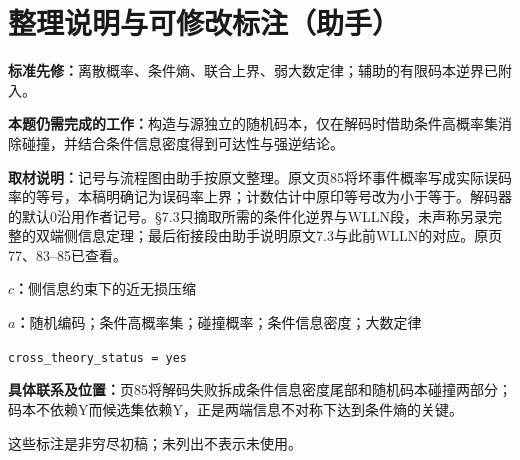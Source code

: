 \documentclass[UTF8,11pt,a4paper]{ctexart}
\theoremstyle{definition}\newtheorem*{definition}{Definition}
\theoremstyle{remark}\newtheorem*{remark}{Remark}
\begin{document}
\section*{整理说明与可修改标注（助手）}
\textbf{标准先修：}离散概率、条件熵、联合上界、弱大数定律；辅助的有限码本逆界已附入。

\textbf{本题仍需完成的工作：}构造与源独立的随机码本，仅在解码时借助条件高概率集消除碰撞，并结合条件信息密度得到可达性与强逆结论。

\textbf{取材说明：}记号与流程图由助手按原文整理。原文页85将坏事件概率写成实际误码率的等号，本稿明确记为误码率上界；计数估计中原印等号改为小于等于。解码器的默认0沿用作者记号。§7.3只摘取所需的条件化逆界与WLLN段，未声称另录完整的双端侧信息定理；最后衔接段由助手说明原文7.3与此前WLLN的对应。原页77、83--85已查看。

\textbf{$c$：}侧信息约束下的近无损压缩

\textbf{$a$：}随机编码；条件高概率集；碰撞概率；条件信息密度；大数定律

\texttt{cross\_theory\_status = yes}

\textbf{具体联系及位置：}页85将解码失败拆成条件信息密度尾部和随机码本碰撞两部分；码本不依赖Y而候选集依赖Y，正是两端信息不对称下达到条件熵的关键。

这些标注是非穷尽初稿；未列出不表示未使用。
\end{document}
